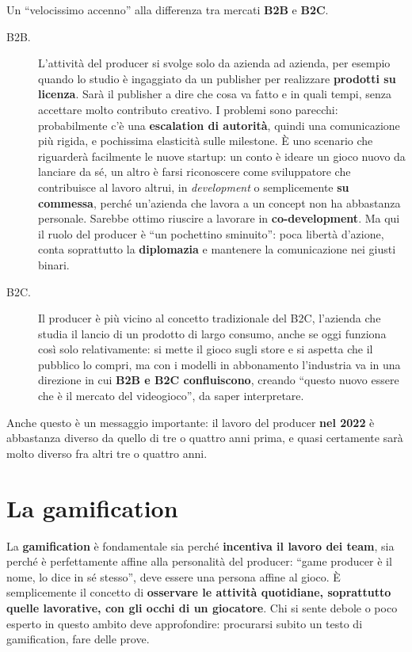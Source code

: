 Un ``velocissimo accenno'' alla differenza tra mercati \textbf{B2B} e
\textbf{B2C}.
\begin{description}
  \item[B2B.] L'attività del producer si svolge solo da azienda ad azienda, per
        esempio quando lo studio è ingaggiato da un publisher per realizzare
        \textbf{prodotti su licenza}. Sarà il publisher a dire che cosa va
        fatto e in quali tempi, senza accettare molto contributo creativo. I
        problemi sono parecchi: probabilmente c'è una \textbf{escalation di
        autorità}, quindi una comunicazione più rigida, e pochissima elasticità
        sulle milestone. È uno scenario che riguarderà facilmente le nuove
        startup: un conto è ideare un gioco nuovo da lanciare da sé, un altro
        è farsi riconoscere come sviluppatore che contribuisce al lavoro altrui,
        in \emph{development} o semplicemente \textbf{su commessa}, perché
        un'azienda che lavora a un concept non ha abbastanza personale.
        Sarebbe ottimo riuscire a lavorare in \textbf{co-development}. Ma qui il
        ruolo del producer è ``un pochettino sminuito'': poca libertà d'azione,
        conta soprattutto la \textbf{diplomazia} e mantenere la comunicazione
        nei giusti binari.
  \item[B2C.] Il producer è più vicino al concetto tradizionale del B2C,
        l'azienda che studia il lancio di un prodotto di largo consumo, anche se
        oggi funziona così solo relativamente: si mette il gioco sugli store e
        si aspetta che il pubblico lo compri, ma con i modelli in abbonamento
        l'industria va in una direzione in cui \textbf{B2B e B2C confluiscono},
        creando ``questo nuovo essere che è il mercato del videogioco'', da
        saper interpretare.
\end{description}
Anche questo è un messaggio importante: il lavoro del producer \textbf{nel 2022}
è abbastanza diverso da quello di tre o quattro anni prima, e quasi certamente
sarà molto diverso fra altri tre o quattro anni.

\section{La gamification}
\label{sec:z5-gamification}

La \textbf{gamification} è fondamentale sia perché \textbf{incentiva il lavoro
dei team}, sia perché è perfettamente affine alla personalità del producer:
``game producer è il nome, lo dice in sé stesso'', deve essere una persona
affine al gioco. È semplicemente il concetto di \textbf{osservare le attività
quotidiane, soprattutto quelle lavorative, con gli occhi di un giocatore}. Chi
si sente debole o poco esperto in questo ambito deve approfondire: procurarsi
subito un testo di gamification, fare delle prove.

